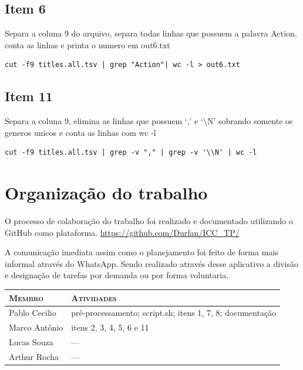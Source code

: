 \documentclass[12pt]{article}
\begin{document}
\subsection*{Item 6}

Separa a coluna 9 do arquivo, separa todas linhas que possuem a palavra Action, conta as linhas e printa o numero em out6.txt

\begin{verbatim}
cut -f9 titles.all.tsv | grep "Action"| wc -l > out6.txt
\end{verbatim}

\subsection*{Item 11}

Separa a coluna 9, elimina as linhas que possuem `,' e `\textbackslash N' sobrando somente os generos unicos e conta as linhas com wc -l

\begin{verbatim}
cut -f9 titles.all.tsv | grep -v "," | grep -v '\\N' | wc -l
\end{verbatim}

\section{Organização do trabalho}

O processo de colaboração do trabalho foi realizado e documentado utilizando o GitHub como plataforma. \url{https://github.com/Durfan/ICC_TP/}

A comunicação imediata assim como o planejamento foi feito de forma mais informal através do WhatsApp. Sendo realizado através desse aplicativo a divisão e designação de tarefas por demanda ou por forma voluntaria.

\begin{table}[!h]
    \begin{tabular}{p{5cm}p{7.5cm}}
    
        \textsc{Membro}      & \textsc{Atividades} \\ 
	    \hline
        Pablo Cecilio & pré-processamento; script.sh; itens 1, 7, 8; documentação \\ 
        Marco Antônio & itens 2, 3, 4, 5, 6 e 11 \\
        Lucas Souza & --- \\
        Arthur Rocha & --- \\

    \end{tabular}
\end{table}
\end{document}
